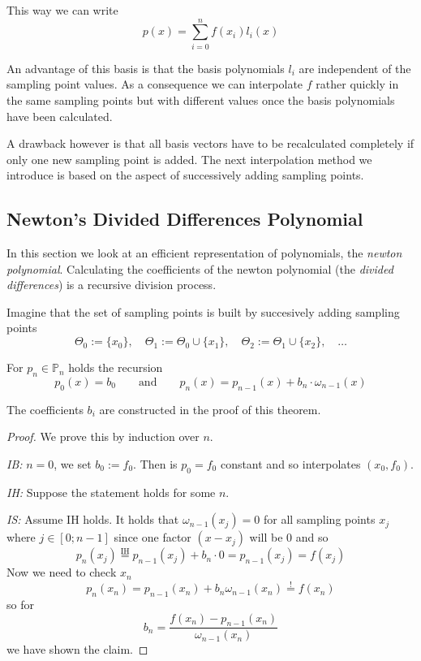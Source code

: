 This way we can write
\[p(x) = \sum_{i = 0}^n f(x_i) l_i(x)\]



An advantage of this basis is that the basis polynomials \(l_i\) are independent of the sampling point values.
As a consequence we can interpolate \(f\) rather quickly in the same sampling points but with different values once the basis polynomials have been calculated.

A drawback however is that all basis vectors have to be recalculated completely if only one new sampling point is added.
The next interpolation method we introduce is based on the aspect of successively adding sampling points.

\subsection{Newton's Divided Differences Polynomial}
In this section we look at an efficient representation of polynomials, the \emph{newton polynomial}.
Calculating the coefficients of the newton polynomial (the \emph{divided differences}) is a recursive division process.

Imagine that the set of sampling points is built by succesively adding sampling points
\[\Theta_0 := \{x_0\}, \quad \Theta_1 := \Theta_0 \cup \{x_1\}, \quad \Theta_2 := \Theta_1 \cup \{x_2\}, \quad\ldots\]

\begin{theorem}\label{thm:div_diff}
   For \(p_n \in \mathbb{P}_n\) holds the recursion
   \[p_0(x) = b_0 \qquad\text{and}\qquad p_n(x) = p_{n-1}(x) + b_n \cdot \omega_{n-1}(x)\]
\end{theorem}
\begin{remark}
   The coefficients \(b_i\) are constructed in the proof of this theorem.
\end{remark}
\begin{proof}
   We prove this by induction over \(n\).

   \emph{IB:} \(n = 0\), we set \(b_0 := f_0\).
   Then is \(p_0 = f_0\) constant and so interpolates \((x_0, f_0)\).

   \emph{IH:} Suppose the statement holds for some \(n\).

   \emph{IS:} Assume IH holds.
   It holds that \(\omega_{n-1}(x_j) = 0\) for all sampling points \(x_j\) where \(j \in [0; n-1]\) since one factor \((x - x_j)\) will be 0 and so
   \[p_n(x_j) \overset{\text{IH}}{=} p_{n-1}(x_j) + b_n \cdot 0 = p_{n-1}(x_j) = f(x_j)\]
   Now we need to check \(x_n\)
   \[p_n(x_n) = p_{n-1}(x_n) + b_n \omega_{n-1}(x_n) \overset{!}{=} f(x_n)\]
   so for
   \[b_n = \frac{f(x_n) - p_{n-1}(x_n)}{\omega_{n-1}(x_n)}\]
   we have shown the claim.
\end{proof}

